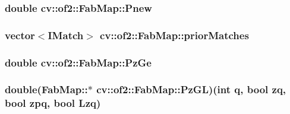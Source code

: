 \hypertarget{classcv_1_1of2_1_1FabMap_a953065fb908d0ac9b72bac04d6779415}{
\subsubsection[{Pnew}]{\setlength{\rightskip}{0pt plus 5cm}double cv\-::of2\-::\-Fab\-Map\-::\-Pnew\hspace{0.3cm}{\ttfamily [protected]}}}\label{classcv_1_1of2_1_1FabMap_a953065fb908d0ac9b72bac04d6779415}
\hypertarget{classcv_1_1of2_1_1FabMap_a0a4a45f92a3ea9fd74ac0b0933eef184}{
\subsubsection[{prior\-Matches}]{\setlength{\rightskip}{0pt plus 5cm}vector$<${\bf I\-Match}$>$ cv\-::of2\-::\-Fab\-Map\-::prior\-Matches\hspace{0.3cm}{\ttfamily [protected]}}}\label{classcv_1_1of2_1_1FabMap_a0a4a45f92a3ea9fd74ac0b0933eef184}
\hypertarget{classcv_1_1of2_1_1FabMap_a0c79d4180f0ffe49bfbfe541b9981e7b}{
\subsubsection[{Pz\-Ge}]{\setlength{\rightskip}{0pt plus 5cm}double cv\-::of2\-::\-Fab\-Map\-::\-Pz\-Ge\hspace{0.3cm}{\ttfamily [protected]}}}\label{classcv_1_1of2_1_1FabMap_a0c79d4180f0ffe49bfbfe541b9981e7b}
\hypertarget{classcv_1_1of2_1_1FabMap_ad0c2ef3b7d4194d6a0eeeac8aca8857f}{
\subsubsection[{Pz\-G\-L}]{\setlength{\rightskip}{0pt plus 5cm}double(Fab\-Map\-::$\ast$ cv\-::of2\-::\-Fab\-Map\-::\-Pz\-G\-L)(int q, bool zq, bool zpq, bool Lzq)\hspace{0.3cm}{\ttfamily [protected]}}}\label{classcv_1_1of2_1_1FabMap_ad0c2ef3b7d4194d6a0eeeac8aca8857f}

